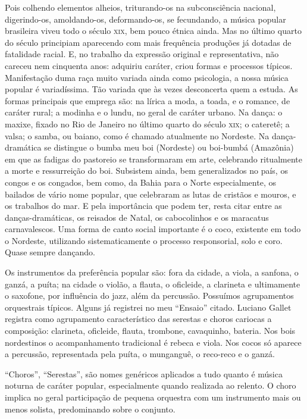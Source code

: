 Pois colhendo elementos alheios, triturando-os na subconsciência
nacional, digerindo-os, amoldando-os, deformando-os, se fecundando, a
música popular brasileira viveu todo o século \textsc{xix}, bem pouco étnica
ainda. Mas no último quarto do século principiam aparecendo com mais
frequência produções já dotadas de fatalidade racial. E, no trabalho da
expressão original e representativa, não careceu nem cinquenta anos:
adquiriu caráter, criou formas e processos típicos. Manifestação duma
raça muito variada ainda como psicologia, a nossa música popular é
variadíssima. Tão variada que às vezes desconcerta quem a estuda. As
formas principais que emprega são: na lírica a moda, a toada, e o
romance, de caráter rural; a modinha e o lundu, no geral de caráter
urbano. Na dança: o maxixe, fixado no Rio de Janeiro no último quarto do
século \textsc{xix}; o cateretê; a valsa; o samba, ou baiano, como é chamado
atualmente no Nordeste. Na dança-dramática se distingue o bumba meu boi
(Nordeste) ou boi-bumbá (Amazônia) em que as fadigas do pastoreio se
transformaram em arte, celebrando ritualmente a morte e ressurreição do
boi. Subsistem ainda, bem generalizados no país, os congos e os
congados, bem como, da Bahia para o Norte especialmente, os bailados de
vário nome popular, que celebraram as lutas de cristãos e mouros, e os
trabalhos do mar. E pela importância que podem ter, resta citar entre as
danças-dramáticas, os reisados de Natal, os cabocolinhos e os maracatus
carnavalescos. Uma forma de canto social importante é o coco, existente
em todo o Nordeste, utilizando sistematicamente o processo responsorial,
solo e coro. Quase sempre dançando.

Os instrumentos da preferência popular são: fora da cidade, a viola, a
sanfona, o ganzá, a puíta; na cidade o violão, a flauta, o oficleide, a
clarineta e ultimamente o saxofone, por influência do jazz, além da
percussão. Possuímos agrupamentos orquestrais típicos. Alguns já
registrei no meu ``Ensaio'' citado. Luciano Gallet registra como
agrupamento característico das serestas e choros cariocas a composição:
clarineta, oficleide, flauta, trombone, cavaquinho, bateria. Nos bois
nordestinos o acompanhamento tradicional é rebeca e viola. Nos cocos só
aparece a percussão, representada pela puíta, o munganguê, o reco-reco e
o ganzá.

``Choros'', ``Serestas'', são nomes genéricos aplicados a tudo quanto é
música noturna de caráter popular, especialmente quando realizada ao
relento. O choro implica no geral participação de pequena orquestra com
um instrumento mais ou menos solista, predominando sobre o conjunto.

